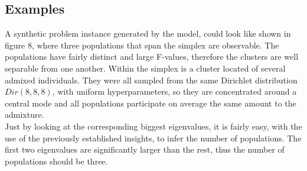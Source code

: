 \documentclass[a4paper, 11pt]{article}
\begin{document}

\subsection{Examples}
A synthetic problem instance generated by the model, could look like shown in figure 8, where three populations that span the simplex are observable. The populations have fairly distinct and large F-values, therefore the clusters are well separable from one another. Within the simplex is a cluster located of several admixed individuals. They were all sampled from the same Dirichlet distribution $Dir(8, 8, 8)$, with uniform hyperparameters, so they are concentrated around a central mode and all populations participate on average the same amount to the admixture. \\
Just by looking at the corresponding biggest eigenvalues, it is fairly easy, with the use of the previously established insights, to infer the number of populations. The first two eigenvalues are significantly larger than the rest, thus the number of populations should be three. 
\end{document}

